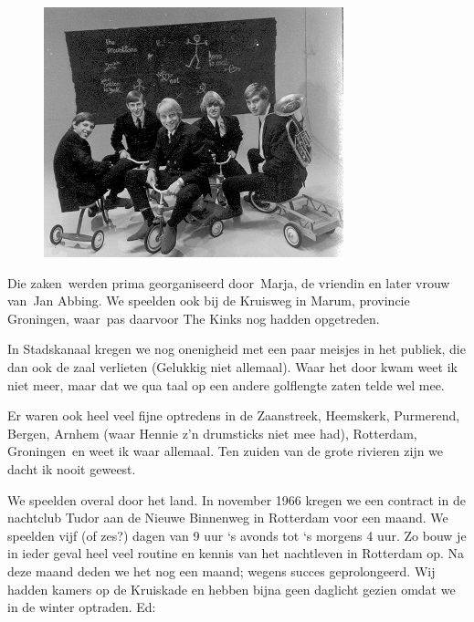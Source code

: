 \documentclass[12pt,twoside, openright]{memoir}
\begin{document}
\begin{figure}
\centering
\includegraphics[width=\textwidth]{img/156-Hartland3.jpg}
\end{figure}

Die zaken werden prima georganiseerd door Marja, de vriendin en later vrouw van Jan Abbing. We speelden ook bij de Kruisweg in Marum, provincie Groningen, waar pas daarvoor The Kinks nog hadden opgetreden.

In Stadskanaal kregen we nog onenigheid met een paar meisjes in het publiek, die dan ook de zaal verlieten (Gelukkig niet allemaal). Waar het door kwam weet ik niet meer, maar dat we qua taal op een andere golflengte zaten telde wel mee. 

Er waren ook heel veel fijne optredens in de Zaanstreek, Heemskerk, Purmerend, Bergen, Arnhem (waar Hennie z'n drumsticks niet mee had), Rotterdam, Groningen en weet ik waar allemaal. Ten zuiden van de grote rivieren zijn we dacht ik nooit geweest. 

We speelden overal door het land. In november 1966 kregen we een contract in de nachtclub Tudor aan de Nieuwe Binnenweg in Rotterdam voor een maand. We speelden vijf (of zes?) dagen van 9 uur `s avonds tot `s morgens 4 uur. Zo bouw je in ieder geval heel veel routine en kennis van het nachtleven in Rotterdam op. Na deze maand deden we het nog een maand; wegens succes geprolongeerd. Wij hadden kamers op de Kruiskade en hebben bijna geen daglicht gezien omdat we in de winter optraden. Ed: 
\end{document}
